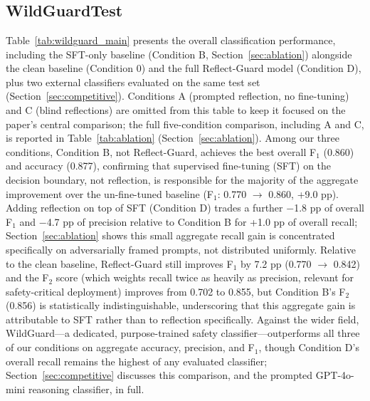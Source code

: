 \documentclass[superintelligence,article,accept,moreauthors]{Definitions/mdpi}
\begin{document}
\section{ %
}
\label{sec:results}

\subsection{WildGuardTest}

Table~\ref{tab:wildguard_main} presents the overall classification performance, including the SFT-only baseline (Condition B, Section~\ref{sec:ablation}) alongside the clean baseline (Condition 0) and the full Reflect-Guard model (Condition D), plus two external classifiers evaluated on the same test set (Section~\ref{sec:competitive}). Conditions A (prompted reflection, no fine-tuning) and C (blind reflections) are omitted from this table to keep it focused on the paper's central comparison; the full five-condition comparison, including A and C, is reported in Table~\ref{tab:ablation} (Section~\ref{sec:ablation}). Among our three conditions, Condition B, not Reflect-Guard, achieves the best overall F$_1$ (0.860) and accuracy (0.877), confirming that supervised fine-tuning (SFT) on the decision boundary, not reflection, is responsible for the majority of the aggregate improvement over the un-fine-tuned baseline (F$_1$: 0.770 $\to$ 0.860, +9.0 pp). Adding reflection on top of SFT (Condition D) trades a further $-$1.8 pp of overall F$_1$ and $-$4.7 pp of precision relative to Condition B for +1.0 pp of overall recall; Section~\ref{sec:ablation} shows this small aggregate recall gain is concentrated specifically on adversarially framed prompts, not distributed uniformly. Relative to the clean baseline, Reflect-Guard still improves F$_1$ by 7.2 pp (0.770 $\to$ 0.842) and the F$_2$ score (which weights recall twice as heavily as precision, relevant for safety-critical deployment) improves from 0.702 to 0.855, but Condition B's F$_2$ (0.856) is statistically indistinguishable, underscoring that this aggregate gain is attributable to SFT rather than to reflection specifically. Against the wider field, WildGuard---a dedicated, purpose-trained safety classifier---outperforms all three of our conditions on aggregate accuracy, precision, and F$_1$, though Condition D's overall recall remains the highest of any evaluated classifier; Section~\ref{sec:competitive} discusses this comparison, and the prompted GPT-4o-mini reasoning classifier, in full.
\end{document}
